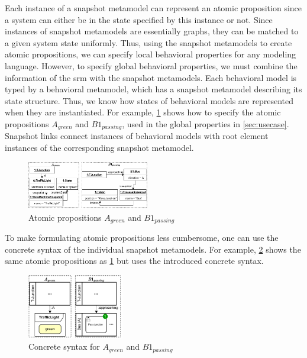 \documentclass{jot}
\begin{document}
Each instance of a snapshot metamodel can represent an atomic proposition since a system can either be in the state specified by this instance or not.
Since instances of snapshot metamodels are essentially graphs, they can be matched to a given system state uniformly.
Thus, using the snapshot metamodels to create atomic propositions, we can specify local behavioral properties for any modeling language.
However, to specify global behavioral properties, we must combine the information of the \gls*{srm} with the snapshot metamodels.
Each behavioral model is typed by a behavioral metamodel, which has a snapshot metamodel describing its state structure.
Thus, we know how states of behavioral models are represented when they are instantiated.
For example, \cref{fig:atomic_propositions} shows how to specify the atomic propositions $A_{green}$ and $B1_{passing}$, used in the global properties in \autoref{sec:usecase}.
Snapshot links connect instances of behavioral models with root element instances of the corresponding snapshot metamodel. 

\begin{figure}[h]
    \centering
    \includegraphics[width=0.475\textwidth]{figures/atomic_props.pdf}
    \caption{Atomic propositions $A_{green}$ and $B1_{passing}$}
    \label{fig:atomic_propositions}
\end{figure}

To make formulating atomic propositions less cumbersome, one can use the concrete syntax of the individual snapshot metamodels.
For example, \cref{fig:atomic_propositions_concrete} shows the same atomic propositions as \cref{fig:atomic_propositions} but uses the introduced concrete syntax.

\begin{figure}[h]
    \centering
    \includegraphics[width=0.375\textwidth]{figures/atomic_props_concrete.pdf}
    \caption{Concrete syntax for $A_{green}$ and $B1_{passing}$}
    \label{fig:atomic_propositions_concrete}
\end{figure}
\end{document}
